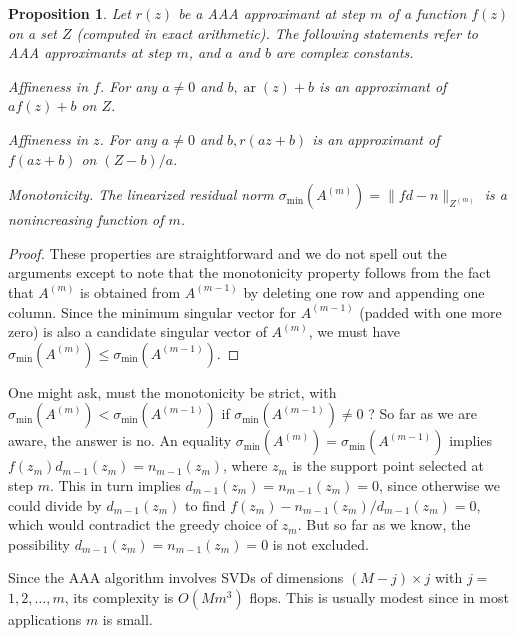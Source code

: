 \documentclass[11pt]{article}
\newtheorem{proposition}[theorem]{Proposition}
\theoremstyle{definition}
\begin{document}
    \begin{proposition}
        Let $r(z)$ be a AAA approximant at step $m$ of a function $f(z)$ on a set $Z$ (computed in exact arithmetic). The following statements refer to AAA approximants at step $m$, and $a$ and $b$ are complex constants.
    
    Affineness in $f$. For any $a \neq 0$ and $b, \operatorname{ar}(z)+b$ is an approximant of $a f(z)+b$ on $Z$.
    
    Affineness in $z$. For any $a \neq 0$ and $b, r(a z+b)$ is an approximant of $f(a z+b)$ on $(Z-b) / a$.
    
    Monotonicity. The linearized residual norm $\sigma_{\min }\left(A^{(m)}\right)=\|f d-n\|_{Z^{(m)}}$ is a nonincreasing function of $m$.
    \end{proposition}
    
    \begin{proof}
        These properties are straightforward and we do not spell out the arguments except to note that the monotonicity property follows from the fact that $A^{(m)}$ is obtained from $A^{(m-1)}$ by deleting one row and appending one column. Since the minimum singular vector for $A^{(m-1)}$ (padded with one more zero) is also a candidate singular vector of $A^{(m)}$, we must have $\sigma_{\min }\left(A^{(m)}\right) \leq \sigma_{\min }\left(A^{(m-1)}\right)$.
    \end{proof}
    
    One might ask, must the monotonicity be strict, with $\sigma_{\min }\left(A^{(m)}\right)<\sigma_{\min }\left(A^{(m-1)}\right)$ if $\sigma_{\min }\left(A^{(m-1)}\right) \neq 0$ ? So far as we are aware, the answer is no. An equality $\sigma_{\min }\left(A^{(m)}\right)=\sigma_{\min }\left(A^{(m-1)}\right)$ implies $f\left(z_{m}\right) d_{m-1}\left(z_{m}\right)=n_{m-1}\left(z_{m}\right)$, where $z_{m}$ is the support point selected at step $m$. This in turn implies $d_{m-1}\left(z_{m}\right)=n_{m-1}\left(z_{m}\right)=0$, since otherwise we could divide by $d_{m-1}\left(z_{m}\right)$ to find $f\left(z_{m}\right)-n_{m-1}\left(z_{m}\right) / d_{m-1}\left(z_{m}\right)=0$, which would contradict the greedy choice of $z_{m}$. But so far as we know, the possibility $d_{m-1}\left(z_{m}\right)=n_{m-1}\left(z_{m}\right)=0$ is not excluded.
    
    Since the AAA algorithm involves SVDs of dimensions $(M-j) \times j$ with $j=$ $1,2, \ldots, m$, its complexity is $O\left(M m^{3}\right)$ flops. This is usually modest since in most applications $m$ is small.
\end{document}
